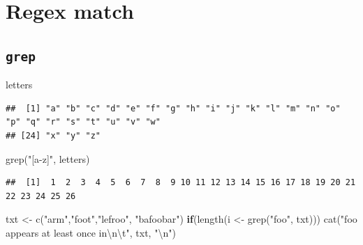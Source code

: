 \documentclass[
]{article}
\newenvironment{Shaded}{\begin{snugshade}}{\end{snugshade}}
\newcommand{\ControlFlowTok}[1]{\textcolor[rgb]{0.13,0.29,0.53}{\textbf{#1}}}
\newcommand{\FunctionTok}[1]{\textcolor[rgb]{0.00,0.00,0.00}{#1}}
\newcommand{\NormalTok}[1]{#1}
\newcommand{\OtherTok}[1]{\textcolor[rgb]{0.56,0.35,0.01}{#1}}
\newcommand{\SpecialCharTok}[1]{\textcolor[rgb]{0.00,0.00,0.00}{#1}}
\newcommand{\StringTok}[1]{\textcolor[rgb]{0.31,0.60,0.02}{#1}}
\begin{document}
\hypertarget{regex-match}{%
\section{Regex match}\label{regex-match}}

\hypertarget{grep}{%
\subsection{\texorpdfstring{\texttt{grep}}{grep}}\label{grep}}

\begin{Shaded}
\begin{Highlighting}[]
\NormalTok{letters}
\end{Highlighting}
\end{Shaded}

\begin{verbatim}
##  [1] "a" "b" "c" "d" "e" "f" "g" "h" "i" "j" "k" "l" "m" "n" "o" "p" "q" "r" "s" "t" "u" "v" "w"
## [24] "x" "y" "z"
\end{verbatim}

\begin{Shaded}
\begin{Highlighting}[]
\FunctionTok{grep}\NormalTok{(}\StringTok{"[a{-}z]"}\NormalTok{, letters)}
\end{Highlighting}
\end{Shaded}

\begin{verbatim}
##  [1]  1  2  3  4  5  6  7  8  9 10 11 12 13 14 15 16 17 18 19 20 21 22 23 24 25 26
\end{verbatim}

\begin{Shaded}
\begin{Highlighting}[]
\NormalTok{txt }\OtherTok{\textless{}{-}} \FunctionTok{c}\NormalTok{(}\StringTok{"arm"}\NormalTok{,}\StringTok{"foot"}\NormalTok{,}\StringTok{"lefroo"}\NormalTok{, }\StringTok{"bafoobar"}\NormalTok{)}
\ControlFlowTok{if}\NormalTok{(}\FunctionTok{length}\NormalTok{(i }\OtherTok{\textless{}{-}} \FunctionTok{grep}\NormalTok{(}\StringTok{"foo"}\NormalTok{, txt)))}
  \FunctionTok{cat}\NormalTok{(}\StringTok{"\textquotesingle{}foo\textquotesingle{} appears at least once in}\SpecialCharTok{\textbackslash{}n\textbackslash{}t}\StringTok{"}\NormalTok{, txt, }\StringTok{"}\SpecialCharTok{\textbackslash{}n}\StringTok{"}\NormalTok{)}
\end{Highlighting}
\end{Shaded}
\end{document}
